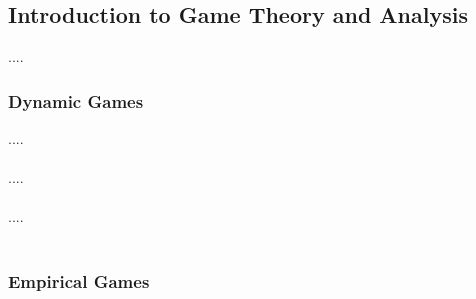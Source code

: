\subsection{Introduction to Game Theory and Analysis}

\begin{flushleft}
    ....
\end{flushleft}

\subsubsection{Dynamic Games}

\begin{flushleft}
    ....\\~\\

    ....\\~\\
    
    ....\\~\\
\end{flushleft}

\subsubsection{Empirical Games}
